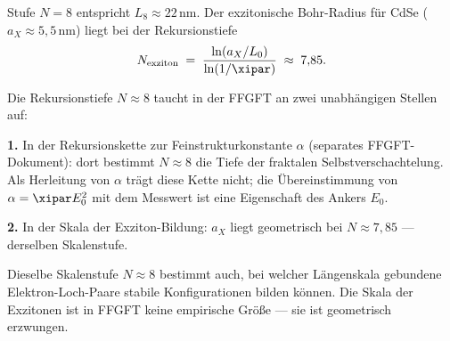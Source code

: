 \begin{center}
\end{center}

Stufe $N = 8$ entspricht $L_8 \approx 22$\,nm.
Der exzitonische Bohr-Radius für CdSe ($a_X \approx 5{,}5$\,nm)
liegt bei der Rekursionstiefe
\begin{equation}
  N_{\text{exziton}} \;=\;
  \frac{\ln(a_X / L_0)}{\ln(1/\xipar)} \;\approx\; 7{,}85.
\end{equation}

\begin{foundation}
Die Rekursionstiefe $N \approx 8$ taucht in der FFGFT
an zwei unabhängigen Stellen auf:

\textbf{1.} In der Rekursionskette zur Feinstrukturkonstante $\alpha$
(separates FFGFT-Dokument): dort bestimmt $N \approx 8$ die Tiefe der
fraktalen Selbstverschachtelung. Als Herleitung von $\alpha$ trägt diese
Kette nicht; die Übereinstimmung von $\alpha = \xipar E_0^2$ mit dem Messwert
ist eine Eigenschaft des Ankers $E_0$.

\textbf{2.} In der Skala der Exziton-Bildung: $a_X$ liegt geometrisch
bei $N \approx 7{,}85$ --- derselben Skalenstufe.

Dieselbe Skalenstufe $N \approx 8$
bestimmt auch, bei welcher Längenskala gebundene
Elektron-Loch-Paare stabile Konfigurationen bilden können.
Die Skala der Exzitonen ist in FFGFT keine empirische Größe ---
sie ist geometrisch erzwungen.
\end{foundation}

